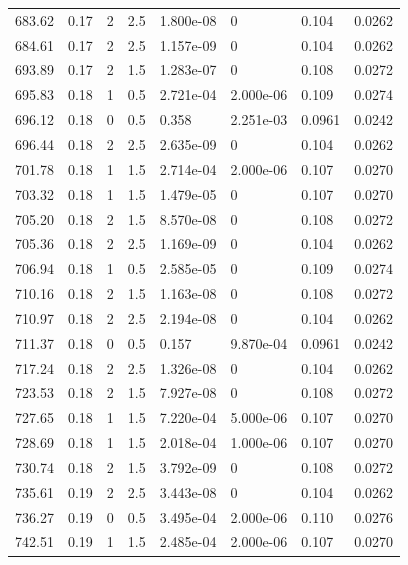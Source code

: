 \documentclass[preview]{standalone}
\begin{document}
{{{{{\begin{tabular}{L{1.2cm}C{1.2cm} C{0.3cm}C{0.5cm} C{1.4cm}C{1.4cm} C{1.4cm}C{1.4cm}}
  683.62  &  0.17  & 2     & 2.5 &  1.800e-08  & 0  & 0.104 &  0.0262   \\ 
  684.61  &  0.17  & 2     & 2.5 &  1.157e-09  & 0  & 0.104 &  0.0262   \\ 
  693.89  &  0.17  & 2     & 1.5 &  1.283e-07  & 0  & 0.108 &  0.0272   \\ 
  695.83  &  0.18  & 1     & 0.5 &  2.721e-04  & 2.000e-06  & 0.109 &  0.0274   \\ 
  696.12  &  0.18  & 0     & 0.5 &  0.358  & 2.251e-03  & 0.0961 &  0.0242   \\ 
  696.44  &  0.18  & 2     & 2.5 &  2.635e-09  & 0  & 0.104 &  0.0262   \\ 
  701.78  &  0.18  & 1     & 1.5 &  2.714e-04  & 2.000e-06  & 0.107 &  0.0270   \\ 
  703.32  &  0.18  & 1     & 1.5 &  1.479e-05  & 0  & 0.107 &  0.0270   \\ 
  705.20  &  0.18  & 2     & 1.5 &  8.570e-08  & 0  & 0.108 &  0.0272   \\ 
  705.36  &  0.18  & 2     & 2.5 &  1.169e-09  & 0  & 0.104 &  0.0262   \\ 
  706.94  &  0.18  & 1     & 0.5 &  2.585e-05  & 0  & 0.109 &  0.0274   \\ 
  710.16  &  0.18  & 2     & 1.5 &  1.163e-08  & 0  & 0.108 &  0.0272   \\ 
  710.97  &  0.18  & 2     & 2.5 &  2.194e-08  & 0  & 0.104 &  0.0262   \\ 
  711.37  &  0.18  & 0     & 0.5 &  0.157  & 9.870e-04  & 0.0961 &  0.0242   \\ 
  717.24  &  0.18  & 2     & 2.5 &  1.326e-08  & 0  & 0.104 &  0.0262   \\ 
  723.53  &  0.18  & 2     & 1.5 &  7.927e-08  & 0  & 0.108 &  0.0272   \\ 
  727.65  &  0.18  & 1     & 1.5 &  7.220e-04  & 5.000e-06  & 0.107 &  0.0270   \\ 
  728.69  &  0.18  & 1     & 1.5 &  2.018e-04  & 1.000e-06  & 0.107 &  0.0270   \\ 
  730.74  &  0.18  & 2     & 1.5 &  3.792e-09  & 0  & 0.108 &  0.0272   \\ 
  735.61  &  0.19  & 2     & 2.5 &  3.443e-08  & 0  & 0.104 &  0.0262   \\ 
  736.27  &  0.19  & 0     & 0.5 &  3.495e-04  & 2.000e-06  & 0.110 &  0.0276   \\ 
  742.51  &  0.19  & 1     & 1.5 &  2.485e-04  & 2.000e-06  & 0.107 &  0.0270   \\ 

\end{tabular}}}}}}
\end{document}
